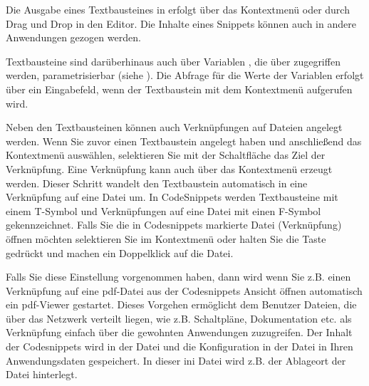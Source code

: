 
Die Ausgabe eines Textbausteines in \codeblocks erfolgt über das Kontextmenü  oder durch Drag und Drop in den Editor. Die Inhalte eines Snippets können auch in andere Anwendungen gezogen werden.

Textbausteine sind darüberhinaus auch über Variablen , die über  zugegriffen werden, parametrisierbar (siehe ). Die Abfrage für die Werte der Variablen erfolgt über ein Eingabefeld, wenn der Textbaustein mit dem Kontextmenü  aufgerufen wird.

Neben den Textbausteinen können auch Verknüpfungen auf Dateien angelegt werden. Wenn Sie zuvor einen Textbaustein angelegt haben und anschließend das Kontextmenü  auswählen, selektieren Sie mit der Schaltfläche  das Ziel der Verknüpfung. Eine Verknüpfung kann auch über das Kontextmenü  erzeugt werden. Dieser Schritt wandelt den Textbaustein automatisch in eine Verknüpfung auf eine Datei um. In CodeSnippets werden Textbausteine mit einem T-Symbol und Verknüpfungen auf eine Datei mit einen F-Symbol gekennzeichnet. Falls Sie die in Codesnippets markierte Datei (Verknüpfung) öffnen möchten selektieren Sie im Kontextmenü  oder halten Sie die  Taste gedrückt und machen ein Doppelklick auf die Datei.


Falls Sie diese Einstellung vorgenommen haben, dann wird wenn Sie z.B. einen Verknüpfung auf eine pdf-Datei aus der Codesnippets Ansicht öffnen automatisch ein pdf-Viewer gestartet. Dieses Vorgehen ermöglicht dem Benutzer Dateien, die über das Netzwerk verteilt liegen, wie z.B. Schaltpläne, Dokumentation etc. als Verknüpfung einfach über die gewohnten Anwendungen zuzugreifen. Der Inhalt der Codesnippets wird in der Datei  und die Konfiguration in der Datei  in Ihren Anwendungsdaten gespeichert. In dieser ini Datei wird z.B. der Ablageort der Datei  hinterlegt.

